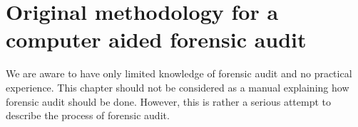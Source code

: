 \chapter{Original methodology for a computer aided forensic audit}
%
%
%


We are aware to have only limited knowledge of forensic audit and no practical experience. This chapter should not be considered as a manual explaining how forensic audit should be done.  However, this is rather a serious attempt to describe the process of forensic audit.


